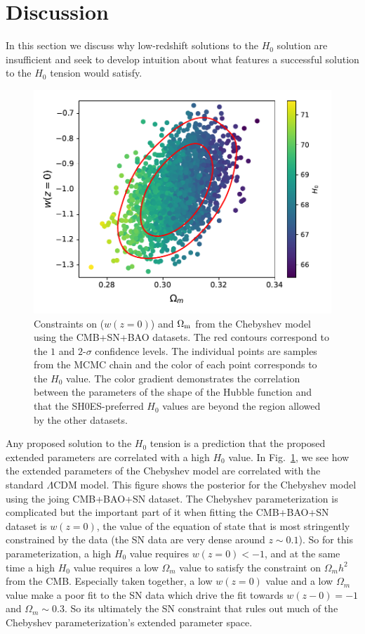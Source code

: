 \documentclass[
 reprint,
 amsmath,amssymb,
 aps,
]{revtex4-2}
\begin{document}
\section{Discussion}

In this section we discuss why low-redshift solutions to the $H_0$ solution are insufficient and seek to develop intuition about what features a successful solution to the $H_0$ tension would satisfy. 

\begin{figure}
    \centering
    \includegraphics[width=\columnwidth]{color_test_cheb_CMB_BAO_SN.pdf}
    \caption{Constraints on ($w(z=0)$) and $\Omega_{\rm m}$ from the Chebyshev model using the CMB+SN+BAO datasets. The red contours correspond to the $1$ and $2$-$\sigma$ confidence levels.  The individual points are samples from the MCMC chain and the color of each point corresponds to the $H_0$ value. The color gradient demonstrates the correlation between the parameters of the shape of the Hubble function and that the SH0ES-preferred $H_0$ values are beyond the region allowed by the other datasets.}
    \label{fig:correlations}
\end{figure}

Any proposed solution to the $H_0$ tension is a prediction that the proposed extended parameters are correlated with a high $H_0$ value.  In Fig.~\ref{fig:correlations}, we see how the extended parameters of the Chebyshev model are correlated with the standard $\Lambda$CDM model. This figure shows the posterior for the Chebyshev model using the joing CMB+BAO+SN dataset. The Chebyshev parameterization is complicated but the important part of it when fitting the CMB+BAO+SN dataset is $w(z=0)$, the value of the equation of state that is most stringently constrained by the data (the SN data are very dense around $z\sim 0.1$). So for this parameterization, a high $H_0$ value requires $w(z=0)<-1$, and at the same time a high $H_0$ value requires a low $\Omega_m$ value to satisfy the constraint on $\Omega_m h^2$ from the CMB.  Especially taken together, a low $w(z=0)$ value and a low $\Omega_m$ value make a poor fit to the SN data which drive the fit towards $w(z-0)=-1$ and $\Omega_m\sim0.3$. So its ultimately the SN constraint that rules out much of the Chebyshev parameterization's extended parameter space.
\end{document}
